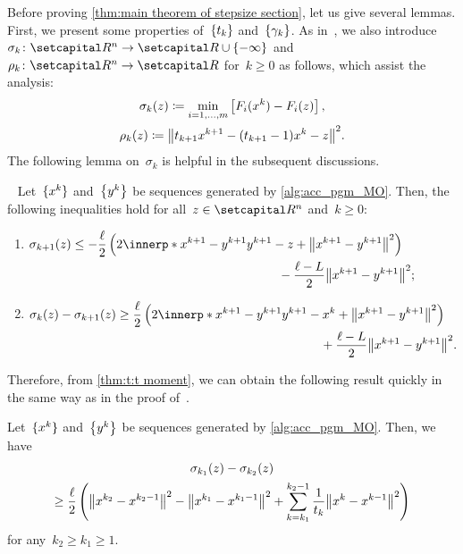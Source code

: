 \documentclass[../main]{subfiles}
\begin{document}
Before proving \cref{thm:main theorem of stepsize section}, let us give several lemmas.
First, we present some properties of~$\set{t_k}$ and~$\set*{\gamma_k}$.
As in~\cite{Tanabe2022a}, we also introduce~$\sigma_k \colon \setR^n \to \setR \cup \set{- \infty}$ and~$\rho_k \colon \setR^n \to \setR$ for~$k \ge 0$ as follows, which assist the analysis:
\[ \label{eq:sigma rho}
\begin{gathered} 
    \sigma_k(z) \coloneqq \min_{i = 1, \dots, m} \left[ F_i(x^k) - F_i(z) \right], \\
        \rho_k(z) \coloneqq \norm*{t_{k + 1} x^{k + 1} - (t_{k + 1} - 1) x^k - z}^2
.\end{gathered}
\]
The following lemma on~$\sigma_k$ is helpful in the subsequent discussions.
\begin{lemma}~\cite[Lemma 5.1]{Tanabe2022a} \label{thm:sigma}
    Let~$\set{x^k}$ and~$\set*{y^k}$ be sequences generated by \cref{alg:acc_pgm_MO}.
    Then, the following inequalities hold for all~$z \in \setR^n$ and~$k \ge 0$:
    \begin{enumerate}
        \item \label{thm:sigma:1} $\begin{multlined}[t] \sigma_{k + 1}(z) \le - \frac{\ell}{2} \left( 2 \innerp*{x^{k + 1} - y^{k + 1}}{y^{k + 1} - z} + \norm*{x^{k + 1} - y^{k + 1}}^2 \right)\\
            \displaystyle - \frac{\ell - L}{2} \norm*{x^{k + 1} - y^{k + 1}}^2;\end{multlined}$
        \item \label{thm:sigma:2}$\begin{multlined}[t]
                \sigma_k(z) - \sigma_{k + 1}(z) \ge \frac{\ell}{2} \left( 2 \innerp*{x^{k + 1} - y^{k + 1}}{y^{k + 1} - x^k} + \norm*{x^{k + 1} - y^{k + 1}}^2 \right) \\
            + \frac{\ell - L}{2} \norm*{x^{k + 1} - y^{k + 1}}^2
        .\end{multlined}$
    \end{enumerate}
\end{lemma}

Therefore, from \cref{thm:t:t moment}, we can obtain the following result quickly in the same way as in the proof of~\cite[Corollary 5.1]{Tanabe2022a}.
\begin{lemma} \label{thm:sigma k1 k2}
    Let~$\set{x^k}$ and~$\set*{y^k}$ be sequences generated by \cref{alg:acc_pgm_MO}.
    Then, we have
    \begin{multline}
        \sigma_{k_1}(z) - \sigma_{k_2}(z) \\
        \ge \frac{\ell}{2} \left( \norm*{x^{k_2} - x^{k_2 - 1}}^2 - \norm*{x^{k_1} - x^{k_1 - 1}}^2 + \sum_{k = k_1}^{k_2 - 1} \frac{1}{t_k} \norm*{x^k - x^{k - 1}}^2 \right)
    \end{multline}
    for any~$k_2 \ge k_1 \ge 1$.
\end{lemma}
\end{document}
